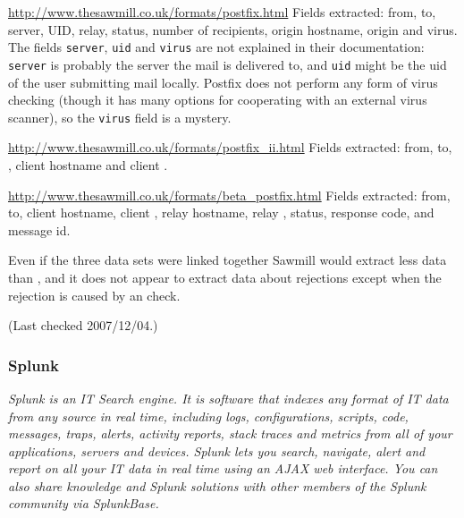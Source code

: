 \documentclass[a4paper,12pt,draft]{article}
\newcommand{\parsername}{\PLP{}}
\begin{document}
\url{http://www.thesawmill.co.uk/formats/postfix.html} \newline Fields
extracted: from, to, server, UID, relay, status, number of recipients,
origin hostname, origin \IP{} and virus.  The fields \texttt{server},
\texttt{uid} and \texttt{virus} are not explained in their documentation:
\texttt{server} is probably the server the mail is delivered to, and
\texttt{uid} might be the uid of the user submitting mail locally.  Postfix
does not perform any form of virus checking (though it has many options for
cooperating with an external virus scanner), so the \texttt{virus} field is
a mystery.

\url{http://www.thesawmill.co.uk/formats/postfix_ii.html} \newline Fields
extracted: from, to, \RBL{}, client hostname and client \IP{}\@.

\url{http://www.thesawmill.co.uk/formats/beta_postfix.html} \newline Fields
extracted: from, to, client hostname, client \IP{}, relay hostname, relay
\IP{}, status, response code, \RBL{} and message id.

Even if the three data sets were linked together Sawmill would extract less
data than \parsername{}, and it does not appear to extract data about
rejections except when the rejection is caused by an \RBL{} check.

(Last checked 2007/12/04.)

\subsubsection{Splunk}

\textit{Splunk is an IT Search engine. It is software that indexes any
format of IT data from any source in real time, including logs,
configurations, scripts, code, messages, traps, alerts, activity reports,
stack traces and metrics from all of your applications, servers and
devices. Splunk lets you search, navigate, alert and report on all your IT
data in real time using an AJAX web interface. You can also share knowledge
and Splunk solutions with other members of the Splunk community via
SplunkBase.\/}
\end{document}

